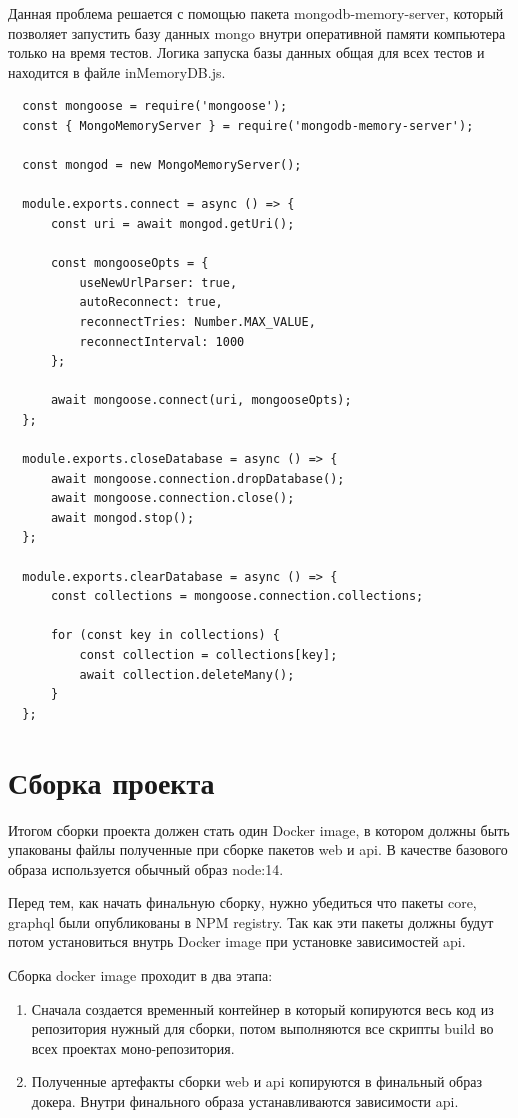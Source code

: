 \documentclass[a4paper,article,14pt]{extarticle}
\begin{document}
Данная проблема решается с помощью пакета mongodb-memory-server, который позволяет запустить базу
данных mongo внутри оперативной памяти компьютера только на время тестов. Логика
запуска базы данных общая для всех тестов и находится в файле inMemoryDB.js.

\begin{verbatim}
  const mongoose = require('mongoose');
  const { MongoMemoryServer } = require('mongodb-memory-server');
  
  const mongod = new MongoMemoryServer();
  
  module.exports.connect = async () => {
      const uri = await mongod.getUri();
  
      const mongooseOpts = {
          useNewUrlParser: true,
          autoReconnect: true,
          reconnectTries: Number.MAX_VALUE,
          reconnectInterval: 1000
      };
  
      await mongoose.connect(uri, mongooseOpts);
  };
  
  module.exports.closeDatabase = async () => {
      await mongoose.connection.dropDatabase();
      await mongoose.connection.close();
      await mongod.stop();
  };
  
  module.exports.clearDatabase = async () => {
      const collections = mongoose.connection.collections;
  
      for (const key in collections) {
          const collection = collections[key];
          await collection.deleteMany();
      }
  };
\end{verbatim}


\section{Сборка проекта}

Итогом сборки проекта должен стать один Docker image, в котором должны быть упакованы файлы полученные при сборке 
пакетов web и api. В качестве базового образа используется обычный образ node:14. 

Перед тем, как начать финальную сборку, нужно убедиться что пакеты core, graphql были опубликованы в NPM registry.
Так как эти пакеты должны будут потом установиться внутрь Docker image при установке зависимостей api.

Сборка docker image проходит в два этапа:

\begin{enumerate}
    \item Сначала создается временный контейнер в который копируются весь код из репозитория нужный для сборки,
    потом выполняются все скрипты build во всех проектах моно-репозитория. 
    \item Полученные артефакты сборки web и api копируются в финальный образ 
    докера. Внутри финального образа устанавливаются зависимости api.
\end{enumerate}
\end{document}
